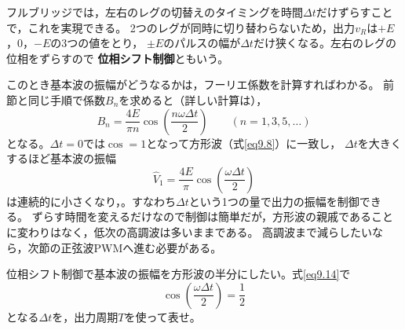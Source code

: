 フルブリッジでは，左右のレグの切替えのタイミングを時間$\mathit{\Delta}t$だけずらすことで，これを実現できる。
2つのレグが同時に切り替わらないため，出力$v_R$は$+E$，$0$，$-E$の3つの値をとり，
$\pm E$のパルスの幅が$\mathit{\Delta}t$だけ狭くなる。左右のレグの位相をずらすので
\textbf{位相シフト制御}ともいう。

このとき基本波の振幅がどうなるかは，フーリエ係数を計算すればわかる。
前節と同じ手順で係数$B_n$を求めると（詳しい計算は），
\begin{equation}
B_n = \frac{4E}{\pi n}\cos\!\left(\frac{n\omega \mathit{\Delta}t}{2}\right)
\qquad(n = 1, 3, 5, \dots)
\label{eq9.13}
\end{equation}
となる。$\mathit{\Delta}t = 0$では$\cos = 1$となって方形波（式\ref{eq9.8}）に一致し，
$\mathit{\Delta}t$を大きくするほど基本波の振幅
\begin{equation}
\hat{V}_1 = \frac{4E}{\pi}\cos\!\left(\frac{\omega \mathit{\Delta}t}{2}\right)
\label{eq9.14}
\end{equation}
は連続的に小さくなり，。すなわち$\mathit{\Delta}t$という1つの量で出力の振幅を制御できる。
ずらす時間を変えるだけなので制御は簡単だが，方形波の親戚であることに変わりはなく，低次の高調波は多いままである。
高調波まで減らしたいなら，次節の正弦波PWMへ進む必要がある。

\begin{問}
\item 位相シフト制御で基本波の振幅を方形波の半分にしたい。式\ref{eq9.14}で
\begin{equation*}
\cos\!\left(\frac{\omega\mathit{\Delta}t}{2}\right) = \frac{1}{2}
\end{equation*}
となる$\mathit{\Delta}t$を，出力周期$T$を使って表せ。
\end{問}


